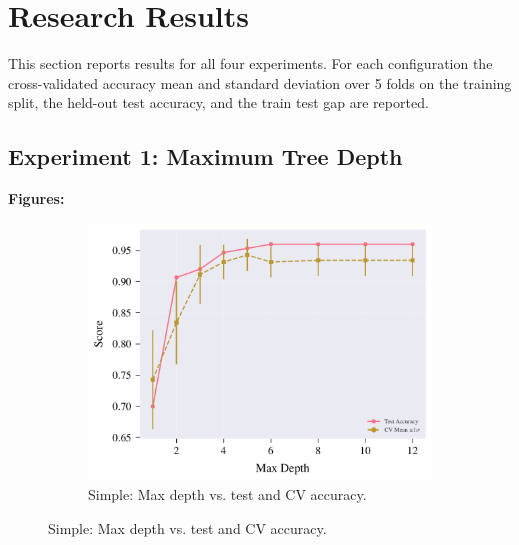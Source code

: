 \documentclass[conference]{IEEEtran}
\begin{document}
\section{Research Results}

\label{sec:results}

This section reports results for all four experiments. For each configuration the cross-validated accuracy mean and standard deviation over 5 folds on 
the training split, the held-out test accuracy, and the train test gap are reported. 


\subsection{Experiment 1: Maximum Tree Depth}
\label{sec:results-exp1}

\textbf{Figures:}
\begin{figure}[H]
  \centering
  \begin{subfigure}[b]{\columnwidth}
    \centering
    \includegraphics[width=\linewidth]{images/simple_depth_accuracy.pdf}
    \caption{Simple: Max depth vs. test and CV accuracy.}
    \label{fig:exp1-simple-acc}
  \end{subfigure}\vspace{6pt}


\end{figure}
\end{document}
